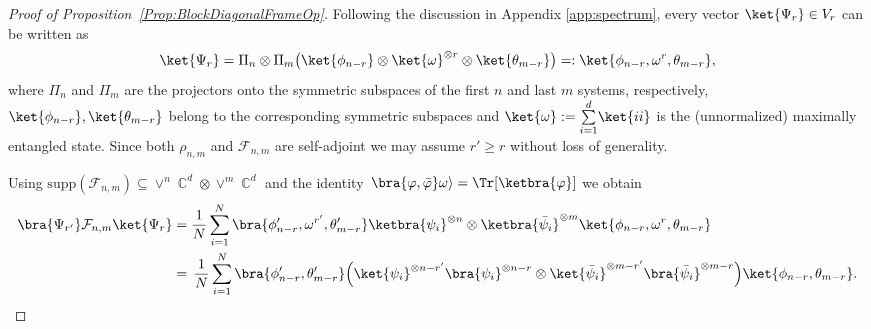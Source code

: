 \documentclass[aps,twocolumn,pra,superscriptaddress,nofootinbib]{revtex4-2}
\newcommand{\sumab}[2]{\underset{#1}{\overset{#2}{\sum}}}
\DeclareMathOperator{\C}{\mathbb{C}} %
\begin{document}
\begin{proof}[Proof of Proposition~\ref{Prop:BlockDiagonalFrameOp}]
Following the discussion in Appendix \ref{app:spectrum}, every vector $ \ket{\Psi_{r}} \in V_r$ can be written as
\begin{equation}\label{Eq:Psi_r_form}
\ket{\Psi_{r}}
=
\Pi_{n}\otimes \Pi_{m}
\bigl(\ket{\phi_{n-r}}\otimes \ket{\omega}^{\otimes r}\otimes \ket{\theta_{m-r}}\bigr)
=: \ket{\phi_{n-r},\omega^{r},\theta_{m-r}},
\end{equation}
where $\Pi_{n}$ and $\Pi_{m}$ are the projectors onto the symmetric subspaces of the first $n$ and last
$m$ systems, respectively, $\ket{\phi_{n-r}},\ket{\theta_{m-r}}$ belong to the corresponding symmetric
subspaces and $\ket{\omega}:=\sumab{i=1}{d}\ket{ii}$ is the (unnormalized) maximally entangled state. Since both $\rho_{n,m}$ and $\mathcal F_{n,m}$ are self-adjoint we may assume $r'\ge r$ without loss of
generality.

Using $\mathrm{supp}(\mathcal F_{n,m})\subseteq \vee^{n}\C^d\otimes \vee^{m}\C^d$ and the identity
$\,\bra{\varphi,\bar\varphi}\omega\rangle=\Tr[\ketbra{\varphi}]$ we obtain
\begin{align}
\bra{\Psi_{r'}}\mathcal{F}_{n,m}\ket{\Psi_{r}}
&=
\frac{1}{N}\sum_{i=1}^{N}
\bra{\phi'_{n-r},\omega^{r'},\theta'_{m-r}}
\ketbra{\psi_{i}}^{\otimes n}\otimes \ketbra{\bar{\psi}_{i}}^{\otimes m}
\ket{\phi_{n-r},\omega^{r},\theta_{m-r}}
\nonumber\\
&=
\,\frac{1}{N}\sum_{i=1}^{N}
\bra{\phi'_{n-r},\theta'_{m-r}}
\Bigl(
\ket{\psi_{i}}^{\otimes n-r'}\bra{\psi_{i}}^{\otimes n-r}
\otimes
\ket{\bar{\psi}_{i}}^{\otimes m-r'}\bra{\bar{\psi}_{i}}^{\otimes m-r}
\Bigr)
\ket{\phi_{n-r},\theta_{m-r}}.
\label{Eq:FramOpStep1}
\end{align}


\end{proof}
\end{document}
